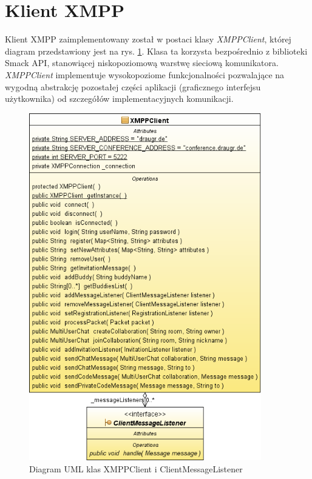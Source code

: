 \documentclass[polish,11pt,a4paper,twoside]{article}
\begin{document}

\section{Klient XMPP}

Klient XMPP zaimplementowany został w postaci klasy \emph{XMPPClient}, której diagram przedstawiony jest na rys. \ref{fig:uml_class_client}. Klasa ta korzysta bezpośrednio z biblioteki Smack API, stanowiącej niskopoziomową warstwę sieciową komunikatora. \emph{XMPPClient} implementuje wysokopoziome funkcjonalności pozwalające na wygodną abstrakcję pozostałej części aplikacji (graficznego interfejsu użytkownika) od szczegółów implementacyjnych komunikacji.
\begin{figure}[!htb]
  \begin{center}
    \includegraphics[width=0.9\textwidth]{img/uml_class_client.png}
    \caption{Diagram UML klas XMPPClient i ClientMessageListener} \label{fig:uml_class_client} 
  \end{center}
\end{figure}
\end{document}
